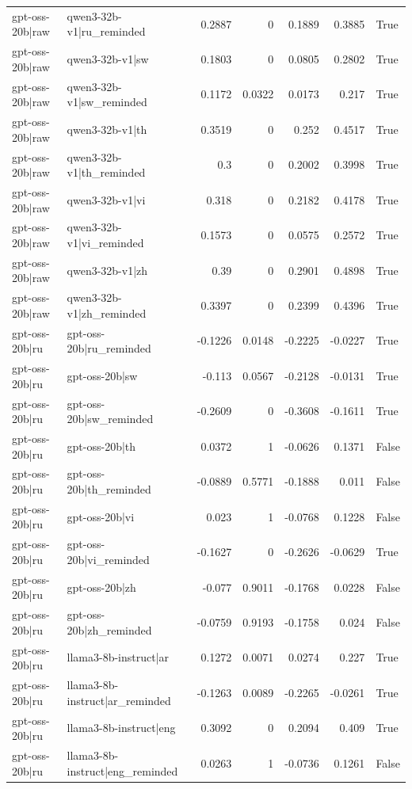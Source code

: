 \begin{table}
\begin{tabular}{l l r r r r l}
gpt-oss-20b|raw & qwen3-32b-v1|ru_reminded & 0.2887 & 0 & 0.1889 & 0.3885 & True \\
gpt-oss-20b|raw & qwen3-32b-v1|sw & 0.1803 & 0 & 0.0805 & 0.2802 & True \\
gpt-oss-20b|raw & qwen3-32b-v1|sw_reminded & 0.1172 & 0.0322 & 0.0173 & 0.217 & True \\
gpt-oss-20b|raw & qwen3-32b-v1|th & 0.3519 & 0 & 0.252 & 0.4517 & True \\
gpt-oss-20b|raw & qwen3-32b-v1|th_reminded & 0.3 & 0 & 0.2002 & 0.3998 & True \\
gpt-oss-20b|raw & qwen3-32b-v1|vi & 0.318 & 0 & 0.2182 & 0.4178 & True \\
gpt-oss-20b|raw & qwen3-32b-v1|vi_reminded & 0.1573 & 0 & 0.0575 & 0.2572 & True \\
gpt-oss-20b|raw & qwen3-32b-v1|zh & 0.39 & 0 & 0.2901 & 0.4898 & True \\
gpt-oss-20b|raw & qwen3-32b-v1|zh_reminded & 0.3397 & 0 & 0.2399 & 0.4396 & True \\
gpt-oss-20b|ru & gpt-oss-20b|ru_reminded & -0.1226 & 0.0148 & -0.2225 & -0.0227 & True \\
gpt-oss-20b|ru & gpt-oss-20b|sw & -0.113 & 0.0567 & -0.2128 & -0.0131 & True \\
gpt-oss-20b|ru & gpt-oss-20b|sw_reminded & -0.2609 & 0 & -0.3608 & -0.1611 & True \\
gpt-oss-20b|ru & gpt-oss-20b|th & 0.0372 & 1 & -0.0626 & 0.1371 & False \\
gpt-oss-20b|ru & gpt-oss-20b|th_reminded & -0.0889 & 0.5771 & -0.1888 & 0.011 & False \\
gpt-oss-20b|ru & gpt-oss-20b|vi & 0.023 & 1 & -0.0768 & 0.1228 & False \\
gpt-oss-20b|ru & gpt-oss-20b|vi_reminded & -0.1627 & 0 & -0.2626 & -0.0629 & True \\
gpt-oss-20b|ru & gpt-oss-20b|zh & -0.077 & 0.9011 & -0.1768 & 0.0228 & False \\
gpt-oss-20b|ru & gpt-oss-20b|zh_reminded & -0.0759 & 0.9193 & -0.1758 & 0.024 & False \\
gpt-oss-20b|ru & llama3-8b-instruct|ar & 0.1272 & 0.0071 & 0.0274 & 0.227 & True \\
gpt-oss-20b|ru & llama3-8b-instruct|ar_reminded & -0.1263 & 0.0089 & -0.2265 & -0.0261 & True \\
gpt-oss-20b|ru & llama3-8b-instruct|eng & 0.3092 & 0 & 0.2094 & 0.409 & True \\
gpt-oss-20b|ru & llama3-8b-instruct|eng_reminded & 0.0263 & 1 & -0.0736 & 0.1261 & False \\

\end{tabular}
\end{table}
